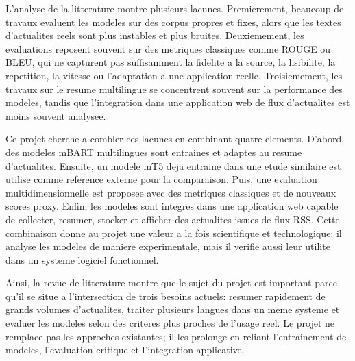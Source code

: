 L'analyse de la litterature montre plusieurs lacunes. Premierement, beaucoup de travaux evaluent les modeles sur des corpus propres et fixes, alors que les textes d'actualites reels sont plus instables et plus bruites. Deuxiemement, les evaluations reposent souvent sur des metriques classiques comme ROUGE ou BLEU, qui ne capturent pas suffisamment la fidelite a la source, la lisibilite, la repetition, la vitesse ou l'adaptation a une application reelle. Troisiemement, les travaux sur le resume multilingue se concentrent souvent sur la performance des modeles, tandis que l'integration dans une application web de flux d'actualites est moins souvent analysee.

Ce projet cherche a combler ces lacunes en combinant quatre elements. D'abord, des modeles mBART multilingues sont entraines et adaptes au resume d'actualites. Ensuite, un modele mT5 deja entraine dans une etude similaire est utilise comme reference externe pour la comparaison. Puis, une evaluation multidimensionnelle est proposee avec des metriques classiques et de nouveaux scores proxy. Enfin, les modeles sont integres dans une application web capable de collecter, resumer, stocker et afficher des actualites issues de flux RSS. Cette combinaison donne au projet une valeur a la fois scientifique et technologique: il analyse les modeles de maniere experimentale, mais il verifie aussi leur utilite dans un systeme logiciel fonctionnel.

Ainsi, la revue de litterature montre que le sujet du projet est important parce qu'il se situe a l'intersection de trois besoins actuels: resumer rapidement de grands volumes d'actualites, traiter plusieurs langues dans un meme systeme et evaluer les modeles selon des criteres plus proches de l'usage reel. Le projet ne remplace pas les approches existantes; il les prolonge en reliant l'entrainement de modeles, l'evaluation critique et l'integration applicative.
